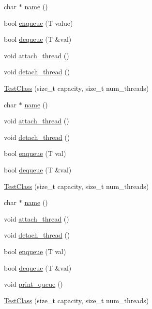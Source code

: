 \begin{DoxyCompactItemize}
char $\ast$ \hyperlink{class_test_class_a1bd0edf8d0e906d97e4b3c768398cf7b}{name} ()
\item 
bool \hyperlink{class_test_class_ac5d4fa7fbb51710fc978146124f1f8cf}{enqueue} (T value)
\item 
bool \hyperlink{class_test_class_a781dcd2216461c876843923c11bb9aac}{dequeue} (T \&val)
\item 
void \hyperlink{class_test_class_a7e6bce4c39c047282ea8c1f1485a260b}{attach\+\_\+thread} ()
\item 
void \hyperlink{class_test_class_a79b3a395c8a1fac7a156228a27d829cc}{detach\+\_\+thread} ()
\item 
\hyperlink{class_test_class_a2caeb43f7bbe5512fac0d4c58f1c2263}{Test\+Class} (size\+\_\+t capacity, size\+\_\+t num\+\_\+threads)
\item 
char $\ast$ \hyperlink{class_test_class_a1bd0edf8d0e906d97e4b3c768398cf7b}{name} ()
\item 
void \hyperlink{class_test_class_a7e6bce4c39c047282ea8c1f1485a260b}{attach\+\_\+thread} ()
\item 
void \hyperlink{class_test_class_a79b3a395c8a1fac7a156228a27d829cc}{detach\+\_\+thread} ()
\item 
bool \hyperlink{class_test_class_a2b4f6df9453394ab73885f875801659d}{enqueue} (T val)
\item 
bool \hyperlink{class_test_class_a781dcd2216461c876843923c11bb9aac}{dequeue} (T \&val)
\item 
\hyperlink{class_test_class_a2caeb43f7bbe5512fac0d4c58f1c2263}{Test\+Class} (size\+\_\+t capacity, size\+\_\+t num\+\_\+threads)
\item 
char $\ast$ \hyperlink{class_test_class_a1bd0edf8d0e906d97e4b3c768398cf7b}{name} ()
\item 
void \hyperlink{class_test_class_a7e6bce4c39c047282ea8c1f1485a260b}{attach\+\_\+thread} ()
\item 
void \hyperlink{class_test_class_a79b3a395c8a1fac7a156228a27d829cc}{detach\+\_\+thread} ()
\item 
bool \hyperlink{class_test_class_a2b4f6df9453394ab73885f875801659d}{enqueue} (T val)
\item 
bool \hyperlink{class_test_class_a781dcd2216461c876843923c11bb9aac}{dequeue} (T \&val)
\item 
void \hyperlink{class_test_class_a794faf7da47f72b05a6b8c57298187e2}{print\+\_\+queue} ()
\item 
\hyperlink{class_test_class_a2caeb43f7bbe5512fac0d4c58f1c2263}{Test\+Class} (size\+\_\+t capacity, size\+\_\+t num\+\_\+threads)

\end{DoxyCompactItemize}
